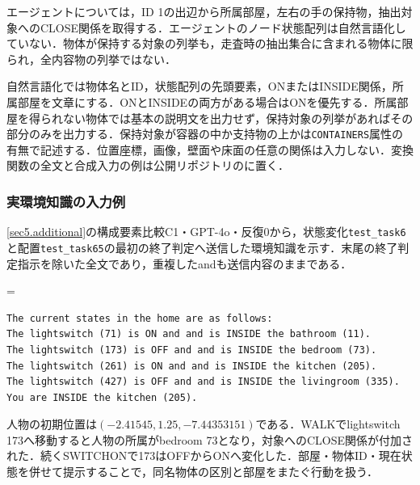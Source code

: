 エージェントについては，ID 1の出辺から所属部屋，左右の手の保持物，抽出対象へのCLOSE関係を取得する．エージェントのノード状態配列は自然言語化していない．物体が保持する対象の列挙も，走査時の抽出集合に含まれる物体に限られ，全内容物の列挙ではない．

自然言語化では物体名とID，状態配列の先頭要素，ONまたはINSIDE関係，所属部屋を文章にする．ONとINSIDEの両方がある場合はONを優先する．所属部屋を得られない物体では基本の説明文を出力せず，保持対象の列挙があればその部分のみを出力する．保持対象が容器の中か支持物の上かは\texttt{CONTAINERS}属性の有無で記述する．位置座標，画像，壁面や床面の任意の関係は入力しない．変換関数の全文と合成入力の例は公開リポジトリのに置く．



\subsubsection{実環境知識の入力例}\label{sec4.real_inputs}
\ref{sec5.additional}の構成要素比較C1・GPT-4o・反復0から，状態変化\texttt{test\_task6}と配置\texttt{test\_task65}の最初の終了判定へ送信した環境知識を示す．末尾の終了判定指示を除いた全文であり，重複したandも送信内容のままである．

\begingroup
\capwidth=\linewidth
\begin{lstlisting}[basicstyle=\ttfamily\scriptsize,breaklines=true,caption={状態変化task6の環境知識全文},label=lst:real_state_input]
The current states in the home are as follows:
The lightswitch (71) is ON and and is INSIDE the bathroom (11).
The lightswitch (173) is OFF and and is INSIDE the bedroom (73).
The lightswitch (261) is ON and and is INSIDE the kitchen (205).
The lightswitch (427) is OFF and and is INSIDE the livingroom (335).
You are INSIDE the kitchen (205).

\end{lstlisting}
\endgroup
人物の初期位置は$(-2.41545,1.25,-7.44353151)$である．WALKでlightswitch 173へ移動すると人物の所属がbedroom 73となり，対象へのCLOSE関係が付加された．続くSWITCHONで173はOFFからONへ変化した．部屋・物体ID・現在状態を併せて提示することで，同名物体の区別と部屋をまたぐ行動を扱う．

